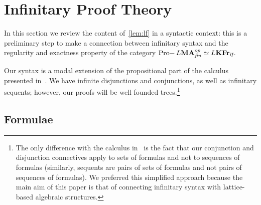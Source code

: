 \documentclass{article}
\theoremstyle{definition}
\DeclareMathOperator{\Pro}{Pro-}
\newcommand{\KFr}{\textup{\textbf{KFr}}}
\newcommand{\MA}{\textup{\textbf{MA}}}
\newcommand{\fin}{\textit{fin}}
\newcommand{\lf}{\textit{lf}}
\begin{document}
\section{Infinitary Proof Theory}\label{sec:calc}

In this section we review the content of~\cref{lem:lf} in a syntactic context: this is a preliminary step to make a connection between infinitary syntax and the regularity and exactness property of the category  $\Pro L\MA_\fin^{op}\simeq L\KFr_\lf$.

Our syntax  is a modal extension of the propositional part of the calculus presented in~\cite[Ch4,\S 22]{Tak}. We  have infinite disjunctions and conjunctions, as well as infinitary sequents; however, our proofs will be well founded trees.\footnote{The only difference with the calculus in~\cite[Ch4,\S 22]{Tak} is the fact that our conjunction and disjunction connectives apply to sets of formulas and not to sequences of formulas (similarly, sequents are pairs of sets of formulas and not pairs of sequences of formulas). We preferred this simplified approach because the main aim of this paper is that of connecting infinitary syntax with lattice-based algebraic structures.}

%






\subsection{Formulae}

\end{document}
